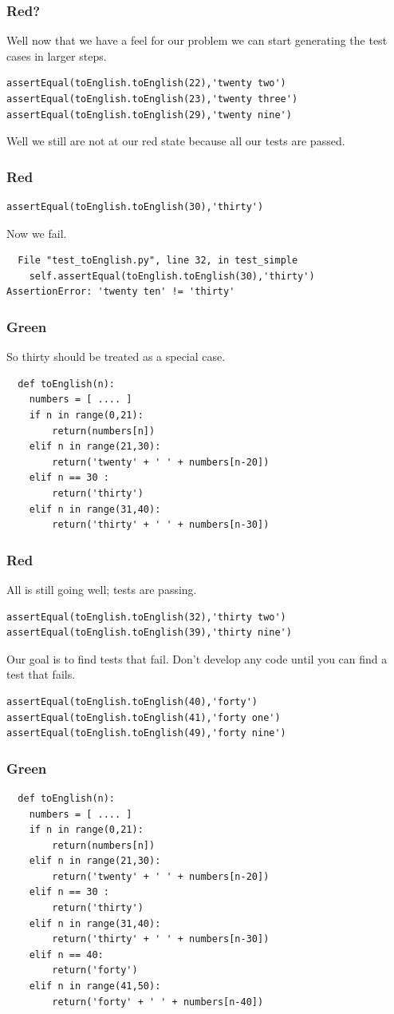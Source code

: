 \documentclass{beamer}
\begin{document}
\begin{frame}[fragile]
\frametitle{Red?}
Well now that we have a feel for our problem we can start generating
the test cases in larger steps.
\begin{lstlisting}
assertEqual(toEnglish.toEnglish(22),'twenty two')
assertEqual(toEnglish.toEnglish(23),'twenty three')
assertEqual(toEnglish.toEnglish(29),'twenty nine')
\end{lstlisting}
Well we still are not at our red state because all our tests are
passed.
\end{frame}
\begin{frame}[fragile]
\frametitle{Red}
\begin{lstlisting}
assertEqual(toEnglish.toEnglish(30),'thirty')
\end{lstlisting}
Now we fail.
\begin{verbatim}
  File "test_toEnglish.py", line 32, in test_simple
    self.assertEqual(toEnglish.toEnglish(30),'thirty')
AssertionError: 'twenty ten' != 'thirty'
\end{verbatim}  
\end{frame}
\begin{frame}[fragile]
  \frametitle{Green}
So thirty should be treated as a special case.
\begin{lstlisting}
  def toEnglish(n):
    numbers = [ .... ]
    if n in range(0,21):
        return(numbers[n])
    elif n in range(21,30):
        return('twenty' + ' ' + numbers[n-20])
    elif n == 30 :
        return('thirty')
    elif n in range(31,40):
        return('thirty' + ' ' + numbers[n-30])
\end{lstlisting}
\end{frame}
\begin{frame}[fragile]
\frametitle{Red}
All is still going well; tests are passing. 
\begin{lstlisting}
assertEqual(toEnglish.toEnglish(32),'thirty two')
assertEqual(toEnglish.toEnglish(39),'thirty nine')
\end{lstlisting}
Our goal is to find tests that fail. Don't develop any code until you
can find a test that fails.
\begin{lstlisting}
assertEqual(toEnglish.toEnglish(40),'forty')
assertEqual(toEnglish.toEnglish(41),'forty one')
assertEqual(toEnglish.toEnglish(49),'forty nine')
\end{lstlisting}
\end{frame}
\begin{frame}[fragile]
  \frametitle{Green}
\begin{lstlisting}
  def toEnglish(n):
    numbers = [ .... ]
    if n in range(0,21):
        return(numbers[n])
    elif n in range(21,30):
        return('twenty' + ' ' + numbers[n-20])
    elif n == 30 :
        return('thirty')
    elif n in range(31,40):
        return('thirty' + ' ' + numbers[n-30])
    elif n == 40:
        return('forty')
    elif n in range(41,50):
        return('forty' + ' ' + numbers[n-40])
\end{lstlisting}
\end{frame}
\end{document}
